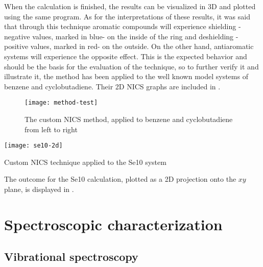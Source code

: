When the calculation is finished, the results can be visualized in 3D and plotted using the same program.
As for the interpretations of these results, it was said that through this technique aromatic compounds will experience shielding -negative values, marked in blue- on the inside of the ring and deshielding -positive values, marked in red- on the outside.
On the other hand, antiaromatic systems will experience the opposite effect.
This is the expected behavior and should be the basis for the evaluation of the technique, so to further verify it and illustrate it, the method has been applied to the well known model systems of benzene and cyclobutadiene.
Their 2D NICS graphs are included in .

\begin{figure}[h]
    \texttt{[image: method-test]}
    \caption[NICS applied to test systems]{The custom NICS method, applied to benzene and cyclobutadiene from left to right}
\end{figure}

\begin{marginfigure}
    \texttt{[image: se10-2d]}
    \caption[NICS applied to Se10]{Custom NICS technique applied to the Se10 system}
\end{marginfigure}

The outcome for the Se10 calculation, plotted as a 2D projection onto the $xy$ plane, is displayed in .
\blindtext[2]



\section{Spectroscopic characterization}
\blindtext

\subsection{Vibrational spectroscopy}
\blindtext
